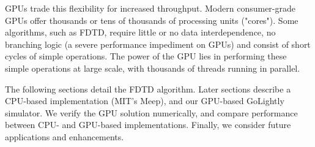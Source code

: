 GPUs trade this flexibility for increased throughput. Modern consumer-grade GPUs offer thousands or tens of thousands of processing units ("cores"). Some algorithms, such as FDTD, require little or no data interdependence, no branching logic (a severe performance impediment on GPUs) and consist of short cycles of simple operations. The power of the GPU lies in performing these simple operations at large scale, with thousands of threads running in parallel. 

The following sections detail the FDTD algorithm. Later sections describe a CPU-based implementation (MIT's  Meep), and our GPU-based GoLightly simulator. We verify the GPU solution numerically, and compare performance between CPU- and GPU-based implementations. Finally, we consider future applications and enhancements. 


